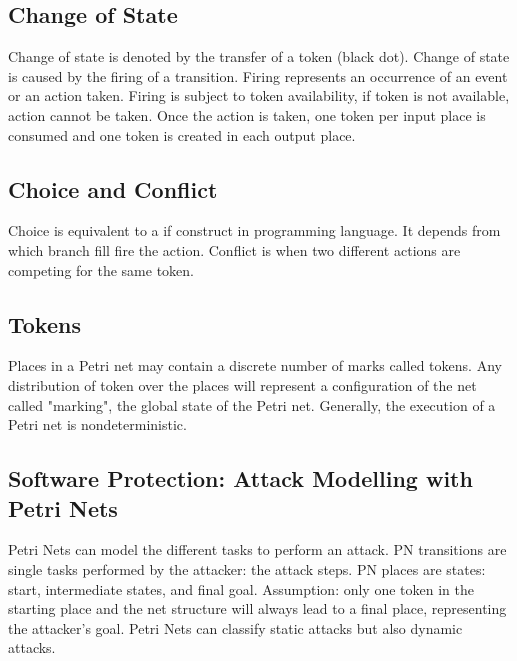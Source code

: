 \subsection{Change of State}

Change of state is denoted by the transfer of a token (black dot). Change of state is caused by the firing of a transition. Firing represents an occurrence of an event or an action taken.
Firing is subject to token availability, if token is not available, action cannot be taken. 
Once the action is taken, one token per input place is consumed and one token is created in each output place. 

\subsection{Choice and Conflict}
Choice is equivalent to a if construct in programming language. 
It depends from which branch fill fire the action. 
Conflict is when two different actions are competing for the same token.

\subsection{Tokens}

Places in a Petri net may contain a discrete number of marks called tokens. 
Any distribution of token over the places will represent a configuration of the net called "marking", the global state of the Petri net. 
Generally, the execution of a Petri net is nondeterministic. 

\subsection{Software Protection: Attack Modelling with Petri Nets}

Petri Nets can model the different tasks to perform an attack. 
PN transitions are single tasks performed by the attacker: the attack steps.
PN places are states: start, intermediate states, and final goal. 
Assumption: only one token in the starting place and the net structure will always lead to a final place, representing the attacker's goal. 
Petri Nets can classify static attacks but also dynamic attacks. 